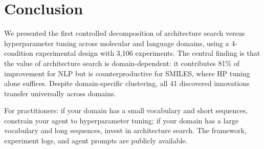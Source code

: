 \section{Conclusion}
\label{sec:conclusion}

We presented the first controlled decomposition of architecture search versus hyperparameter tuning across molecular and language domains, using a 4-condition experimental design with 3{,}106 experiments. The central finding is that the value of architecture search is domain-dependent: it contributes 81\% of improvement for NLP but is counterproductive for SMILES, where HP tuning alone suffices. Despite domain-specific clustering, all 41 discovered innovations transfer universally across domains.

For practitioners: if your domain has a small vocabulary and short sequences, constrain your agent to hyperparameter tuning; if your domain has a large vocabulary and long sequences, invest in architecture search. The framework, experiment logs, and agent prompts are publicly available.
